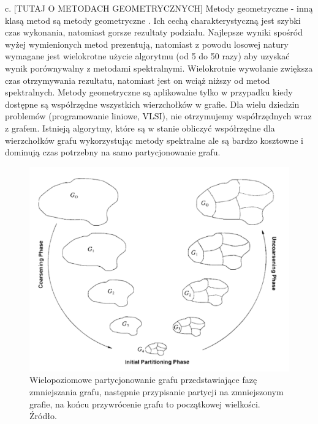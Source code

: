 c. [TUTAJ O METODACH GEOMETRYCZNYCH] Metody geometryczne - inną klasą metod są metody geometryczne \cite{Miller1994ACP, Raghavan93lineand, 185417, MiTeThVa93, NourOmid1987SolvingFE}.
Ich cechą charakterystyczną jest szybki czas wykonania, natomiast gorsze rezultaty podziału.
Najlepsze wyniki spośród wyżej wymienionych metod prezentują\cite{185417, MiTeThVa93}, natomiast z powodu
losowej natury wymagane jest wielokrotne użycie algorytmu (od 5 do 50 razy) aby uzyskać wynik porównywalny
z metodami spektralnymi. Wielokrotnie wywołanie zwiększa czas otrzymywania rezultatu, natomiast jest
on wciąż niższy od metod spektralnych. Metody geometryczne są aplikowalne tylko w przypadku kiedy dostępne
są współrzędne wszystkich wierzchołków w grafie. Dla wielu dziedzin problemów (programowanie liniowe, VLSI),
nie otrzymujemy współrzędnych wraz z grafem. Istnieją algorytmy, które są w stanie obliczyć współrzędne dla
wierzchołków grafu \cite{Chan95geometricspectral} wykorzystując metody spektralne ale są bardzo kosztowne i dominują czas potrzebny
na samo partycjonowanie grafu.
\newline\newline

\begin{figure}
    \vspace{-4mm}
    \includegraphics[width=\linewidth]{images/coarsening}
    \caption{Wielopoziomowe partycjonowanie grafu przedstawiające fazę zmniejszania grafu, następnie przypisanie
    partycji na zmniejszonym grafie, na końcu przywrócenie grafu to początkowej wielkości.
    Źródło\cite{KARYPIS199896}.}
    \label{fig:1}
\end{figure}

